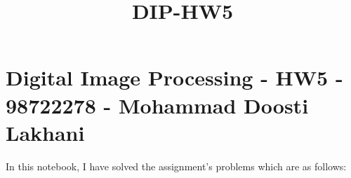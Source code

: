 \documentclass[11pt]{article}
\title{DIP-HW5}
\begin{document}
    
    
    \maketitle
    
    

    
    \hypertarget{digital-image-processing---hw5---98722278---mohammad-doosti-lakhani}{%
\section{Digital Image Processing - HW5 - 98722278 - Mohammad Doosti
Lakhani}\label{digital-image-processing---hw5---98722278---mohammad-doosti-lakhani}}

In this notebook, I have solved the assignment's problems which are as
follows:
\end{document}
